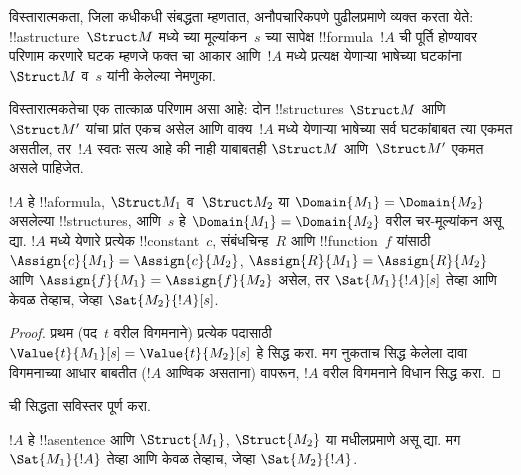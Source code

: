 \documentclass[../../../include/open-logic-section]{subfiles}
\begin{document}


\begin{explain}
विस्तारात्मकता, जिला कधीकधी संबद्धता म्हणतात, अनौपचारिकपणे पुढीलप्रमाणे
व्यक्त करता येते: !!a{structure}~$\Struct M$ मध्ये च्या
मूल्यांकन~$s$ च्या सापेक्ष !!{formula}~$!A$ ची पूर्ति होण्यावर परिणाम
करणारे घटक म्हणजे फक्त चा आकार आणि~$!A$ मध्ये प्रत्यक्ष
येणाऱ्या भाषेच्या घटकांना~$\Struct M$ व~$s$ यांनी केलेल्या नेमणुका.

विस्तारात्मकतेचा एक तात्काळ परिणाम असा आहे: दोन !!{structure}s
$\Struct M$ आणि~$\Struct M'$ यांचा प्रांत एकच असेल आणि वाक्य~$!A$ मध्ये
येणाऱ्या भाषेच्या सर्व घटकांबाबत त्या एकमत असतील, तर~$!A$ स्वतः सत्य
आहे की नाही याबाबतही $\Struct M$ आणि~$\Struct M'$ एकमत असले पाहिजेत.
\end{explain}

\begin{prop}[विस्तारात्मकता]
  $!A$ हे !!a{formula}, $\Struct M_1$ व~$\Struct M_2$ या
  $\Domain{M_1} = \Domain{M_2}$ असलेल्या !!{structure}s, आणि~$s$ हे
  $\Domain{M_1} = \Domain{M_2}$ वरील चर-मूल्यांकन असू द्या. $!A$ मध्ये
  येणारे प्रत्येक !!{constant}~$c$, संबंधचिन्ह~$R$ आणि !!{function}~$f$
  यांसाठी $\Assign{c}{M_1} = \Assign{c}{M_2}$,
  $\Assign{R}{M_1}=\Assign{R}{M_2}$ आणि
  $\Assign{f}{M_1} = \Assign{f}{M_2}$ असेल, तर
  $\Sat{M_1}{!A}[s]$ तेव्हा आणि केवळ तेव्हाच, जेव्हा
  $\Sat{M_2}{!A}[s]$.
\end{prop}

\begin{proof}
  प्रथम (पद~$t$ वरील विगमनाने) प्रत्येक पदासाठी
  $\Value{t}{M_1}[s] = \Value{t}{M_2}[s]$ हे सिद्ध करा. मग नुकताच
  सिद्ध केलेला दावा विगमनाच्या आधार बाबतीत ($!A$ आण्विक असताना) वापरून,
  $!A$ वरील विगमनाने विधान सिद्ध करा.
\end{proof}

\begin{prob}
 ची सिद्धता सविस्तर पूर्ण करा.
\end{prob}

\begin{cor}
  $!A$ हे !!a{sentence} आणि $\Struct{M_1}$, $\Struct{M_2}$ या
   मधीलप्रमाणे असू द्या. मग
  $\Sat{M_1}{!A}$ तेव्हा आणि केवळ तेव्हाच, जेव्हा $\Sat{M_2}{!A}$.
\end{cor}
\end{document}

